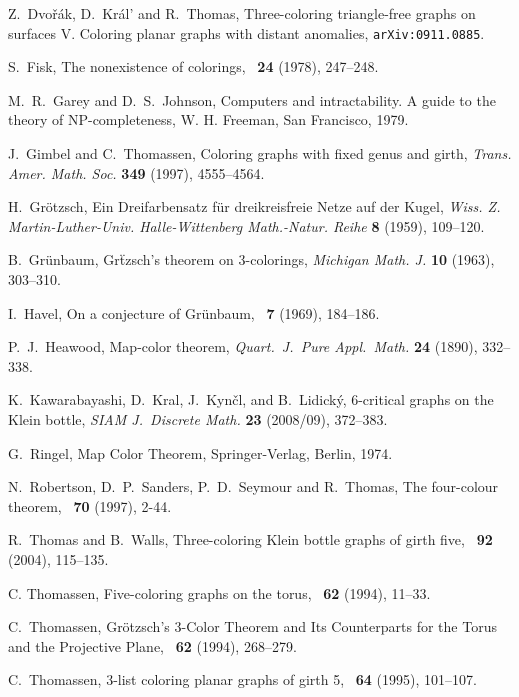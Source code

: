 \documentclass{article}
\begin{document}
\begin{thebibliography}{99}
 Z.~Dvo\v{r}\'ak, D.~Kr\'al' and R.~Thomas,
Three-coloring triangle-free graphs on surfaces V. Coloring planar graphs with distant anomalies,
{\tt arXiv:0911.0885}.

 S.~Fisk, The nonexistence of colorings,
\JCTB\ {\bf 24} (1978), 247--248.

 M.~R.~Garey and D.~S.~Johnson,
Computers and intractability. A guide
to the theory of NP-completeness, W. H. Freeman, San Francisco, 1979.

 J.~Gimbel and C.~Thomassen,
Coloring graphs with fixed genus and girth,
{\em Trans. Amer. Math. Soc.} {\bf 349} (1997), 4555--4564.

 H.~Gr\"otzsch,
Ein Dreifarbensatz f\"ur dreikreisfreie Netze auf der Kugel,
{\em Wiss. Z. Martin-Luther-Univ. Halle-Wittenberg Math.-Natur. Reihe}
{\bf 8} (1959), 109--120.

 B.~Gr\"unbaum,
Gr\"tzsch's theorem on $3$-colorings,
{\it Michigan Math. J.} {\bf 10} (1963), 303--310.

 I.~Havel,
On a conjecture of Gr\"unbaum,
\JCTB\ {\bf 7} (1969), 184--186.

 P.~J.~Heawood, Map-color theorem,
{\it Quart.\ J.~Pure Appl.\ Math.} {\bf 24} (1890), 332--338.

 K.~Kawarabayashi, D.~Kral, J.~Kyn\v{c}l, and B.~Lidick\'y,
6-critical graphs on the Klein bottle,
{\it SIAM J.~Discrete Math.}  {\bf23}  (2008/09), 372--383.

 G.~Ringel, Map Color Theorem,
Springer-Verlag, Berlin, 1974.

N.~Robertson, D.~P.~Sanders, P.~D.~Seymour and R.~Thomas,
The four-colour theorem, \JCTB\ {\bf 70} (1997), 2-44.

 R.~Thomas and B.~Walls,
Three-coloring Klein bottle graphs of girth five,
\JCTB\ {\bf  92}  (2004), 115--135.

 C. Thomassen, Five-coloring graphs on the torus,
\JCTB\ {\bf62} (1994), 11--33.

 C.~Thomassen,
Gr\"otzsch's 3-Color Theorem and Its Counterparts for the Torus and the Projective Plane,
\JCTB\ {\bf 62} (1994), 268--279.

 C.~Thomassen,
$3$-list coloring planar graphs of girth 5,
\JCTB\ {\bf64} (1995), 101--107.


\end{thebibliography}
\end{document}
